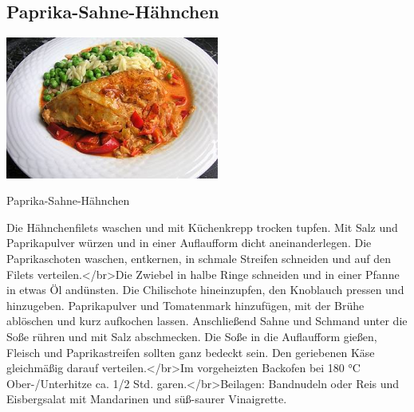 \documentclass[12pt]{book}
\begin{document}
\begin{multicols}{2}
\begin{mytextbox}
\end{mytextbox}\begin{mytextbox}
  \section{Paprika-Sahne-Hähnchen}



  \begin{center}
    \includegraphics[width=7cm]{8d3eb2e33142426fff48e29184626861}
  \end{center}


  \begin{center}
    Paprika-Sahne-Hähnchen
  \end{center}

  Die Hähnchenfilets waschen und mit Küchenkrepp trocken tupfen. Mit Salz und Paprikapulver würzen und in einer Auflaufform dicht aneinanderlegen. Die Paprikaschoten waschen, entkernen, in schmale Streifen schneiden und auf den Filets verteilen.</br>Die Zwiebel in halbe Ringe schneiden und in einer Pfanne in etwas Öl andünsten. Die Chilischote hineinzupfen, den Knoblauch pressen und hinzugeben. Paprikapulver und Tomatenmark hinzufügen, mit der Brühe ablöschen und kurz aufkochen lassen. Anschließend Sahne und Schmand unter die Soße rühren und mit Salz abschmecken. Die Soße in die Auflaufform gießen, Fleisch und Paprikastreifen sollten ganz bedeckt sein. Den geriebenen Käse gleichmäßig darauf verteilen.</br>Im vorgeheizten Backofen bei 180 °C Ober-/Unterhitze ca. 1/2 Std. garen.</br>Beilagen: Bandnudeln oder Reis und Eisbergsalat mit Mandarinen und süß-saurer Vinaigrette.

\end{mytextbox}	\end{multicols}
\end{document}
